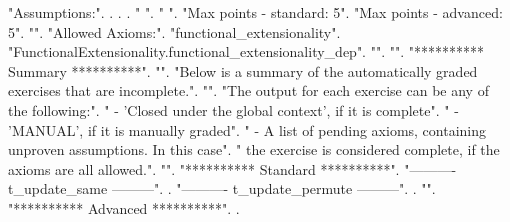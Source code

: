 \documentclass[12pt]{report}
\begin{document}
\begin{coqdoccode}
\coqdocnoindent
{} "Assumptions:".\coqdoceol
\coqdocnoindent
{}.\coqdoceol
\coqdocnoindent
{}  .\coqdoceol
\coqdocnoindent
{} .\coqdoceol
\coqdocnoindent
{} " ".\coqdoceol
\coqdocemptyline
\coqdocnoindent
{} " ".\coqdoceol
\coqdocemptyline
\coqdocnoindent
{} "Max points - standard: 5".\coqdoceol
\coqdocnoindent
{} "Max points - advanced: 5".\coqdoceol
\coqdocnoindent
{} "".\coqdoceol
\coqdocnoindent
{} "Allowed Axioms:".\coqdoceol
\coqdocnoindent
{} "functional\_extensionality".\coqdoceol
\coqdocnoindent
{} "FunctionalExtensionality.functional\_extensionality\_dep".\coqdoceol
\coqdocnoindent
{} "".\coqdoceol
\coqdocnoindent
{} "".\coqdoceol
\coqdocnoindent
{} "********** Summary **********".\coqdoceol
\coqdocnoindent
{} "".\coqdoceol
\coqdocnoindent
{} "Below is a summary of the automatically graded exercises that are incomplete.".\coqdoceol
\coqdocnoindent
{} "".\coqdoceol
\coqdocnoindent
{} "The output for each exercise can be any of the following:".\coqdoceol
\coqdocnoindent
{} "  - 'Closed under the global context', if it is complete".\coqdoceol
\coqdocnoindent
{} "  - 'MANUAL', if it is manually graded".\coqdoceol
\coqdocnoindent
{} "  - A list of pending axioms, containing unproven assumptions. In this case".\coqdoceol
\coqdocnoindent
{} "    the exercise is considered complete, if the axioms are all allowed.".\coqdoceol
\coqdocnoindent
{} "".\coqdoceol
\coqdocnoindent
{} "********** Standard **********".\coqdoceol
\coqdocnoindent
{} "---------- t\_update\_same ---------".\coqdoceol
\coqdocnoindent
{}  .\coqdoceol
\coqdocnoindent
{} "---------- t\_update\_permute ---------".\coqdoceol
\coqdocnoindent
{}  .\coqdoceol
\coqdocnoindent
{} "".\coqdoceol
\coqdocnoindent
{} "********** Advanced **********".\coqdoceol
\coqdocnoindent
{}.\coqdoceol
\coqdocemptyline
\coqdocemptyline
\end{coqdoccode}
\end{document}
